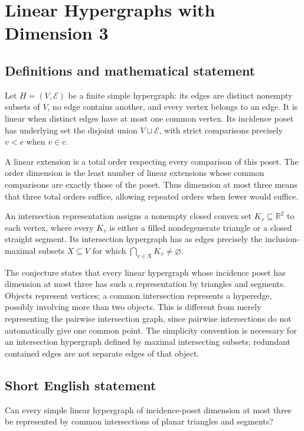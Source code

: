 \documentclass[11pt,a4paper]{article}
\begin{document}
\section*{Linear Hypergraphs with Dimension 3}\label{statement}

\subsection{Definitions and mathematical statement}
Let $H=(V,\mathcal E)$ be a finite simple hypergraph: its edges are distinct nonempty subsets of $V$, no edge contains another, and every vertex belongs to an edge. It is linear when distinct edges have at most one common vertex. Its incidence poset has underlying set the disjoint union $V\sqcup\mathcal E$, with strict comparisons precisely $v<e$ when $v\in e$.

A linear extension is a total order respecting every comparison of this poset. The order dimension is the least number of linear extensions whose common comparisons are exactly those of the poset. Thus dimension at most three means that three total orders suffice, allowing repeated orders when fewer would suffice.

An intersection representation assigns a nonempty closed convex set $K_v\subseteq\mathbb R^2$ to each vertex, where every $K_v$ is either a filled nondegenerate triangle or a closed straight segment. Its intersection hypergraph has as edges precisely the inclusion-maximal subsets $X\subseteq V$ for which $\bigcap_{v\in X}K_v\ne\varnothing$.

The conjecture states that every linear hypergraph whose incidence poset has dimension at most three has such a representation by triangles and segments. Objects represent vertices; a common intersection represents a hyperedge, possibly involving more than two objects. This is different from merely representing the pairwise intersection graph, since pairwise intersections do not automatically give one common point. The simplicity convention is necessary for an intersection hypergraph defined by maximal intersecting subsets; redundant contained edges are not separate edges of that object.
\subsection{Short English statement}
Can every simple linear hypergraph of incidence-poset dimension at most three be represented by common intersections of planar triangles and segments?
\end{document}
